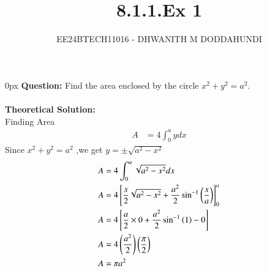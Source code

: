 \documentclass[journal,12pt,onecolumn]{IEEEtran}
\theoremstyle{remark}
\begin{document}
\title{8.1.1.Ex 1}
\author{EE24BTECH11016 - DHWANITH M DODDAHUNDI}
\maketitle
\renewcommand{\thefigure}{\theenumi}
\renewcommand{\thetable}{\theenumi}
\parindent 0px \textbf{Question:} Find the area enclosed by the circle $x^{2}+y^{2}=a^{2}$.\\
\solution\\
\textbf{Theoretical Solution:}\\
Finding Area
\begin{align}
    A&=4\int^{a}_{0}ydx
\end{align}
Since $x^{2}+y^{2}=a^{2}$ ,we get $y=\pm \sqrt{a^{2}-x^{2}}$
\begin{align}
        A&=4\int^{a}_{0}\sqrt{a^{2}-x^{2}}dx \\  
        A&=4{}\left[\frac{x}{2}\sqrt{a^{2}-x^{2}}+\frac{a^{2}}{2} \sin^{-1}{\left(\frac{x}{a}\right)}\right]^a_0\\
                A&=4{}\left[\frac{a}{2}\times 0 +\frac{a^{2}}{2} \sin^{-1}{\left(1\right)}-0\right]\\
                A&=4\left(\frac{a^{2}}{2}\right)\left(\frac{\pi}{2}\right) \\
                A&=\pi a^{2}
\end{align}
\end{document}
